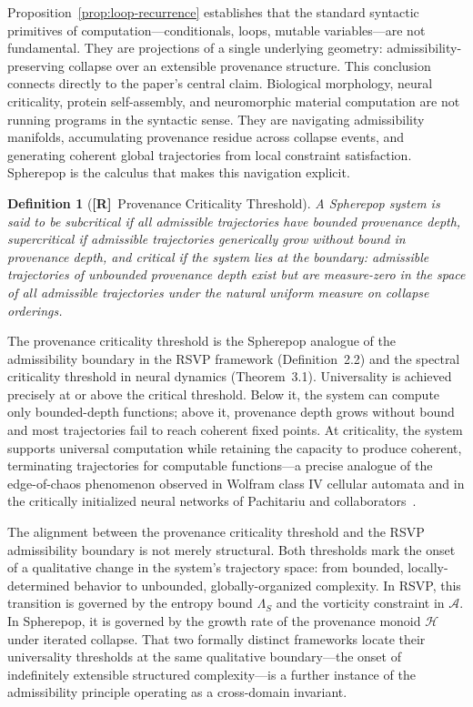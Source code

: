 \documentclass[11pt, oneside]{article}
\numberwithin{equation}{section}
\newcommand{\ClaimR}{\textcolor{rsvpblue}{\textbf{[R]}}}
\theoremstyle{rsvpstyle}
\newtheorem{definition}[theorem]{Definition}
\theoremstyle{remark}
\newcommand{\Adm}{\mathcal{A}}
\begin{document}
Proposition~\ref{prop:loop-recurrence} establishes that the standard syntactic
primitives of computation---conditionals, loops, mutable variables---are not
fundamental. They are projections of a single underlying geometry: admissibility-preserving
collapse over an extensible provenance structure. This conclusion connects directly
to the paper's central claim. Biological morphology, neural criticality, protein
self-assembly, and neuromorphic material computation are not running programs in
the syntactic sense. They are navigating admissibility manifolds, accumulating
provenance residue across collapse events, and generating coherent global trajectories
from local constraint satisfaction. Spherepop is the calculus that makes this
navigation explicit.

\begin{definition}[\ClaimR\ Provenance Criticality Threshold]
\label{def:prov-criticality}
A Spherepop system is said to be \emph{subcritical} if all admissible trajectories
have bounded provenance depth, \emph{supercritical} if admissible trajectories
generically grow without bound in provenance depth, and \emph{critical} if the
system lies at the boundary: admissible trajectories of unbounded provenance depth
exist but are measure-zero in the space of all admissible trajectories under the
natural uniform measure on collapse orderings.
\end{definition}

The provenance criticality threshold is the Spherepop analogue of the admissibility
boundary in the RSVP framework (Definition~2.2) and the spectral criticality threshold
in neural dynamics (Theorem~3.1). Universality is achieved precisely at or above
the critical threshold. Below it, the system can compute only bounded-depth functions;
above it, provenance depth grows without bound and most trajectories fail to reach
coherent fixed points. At criticality, the system supports universal computation
while retaining the capacity to produce coherent, terminating trajectories for
computable functions---a precise analogue of the edge-of-chaos phenomenon observed
in Wolfram class IV cellular automata and in the critically initialized neural
networks of Pachitariu and collaborators~\cite{Pachitariu2026Critical}.

The alignment between the provenance criticality threshold and the RSVP admissibility
boundary is not merely structural. Both thresholds mark the onset of a qualitative
change in the system's trajectory space: from bounded, locally-determined behavior
to unbounded, globally-organized complexity. In RSVP, this transition is governed
by the entropy bound $\Lambda_S$ and the vorticity constraint in $\Adm$. In Spherepop,
it is governed by the growth rate of the provenance monoid $\mathcal{H}$ under
iterated collapse. That two formally distinct frameworks locate their universality
thresholds at the same qualitative boundary---the onset of indefinitely extensible
structured complexity---is a further instance of the admissibility principle operating
as a cross-domain invariant.
\end{document}

